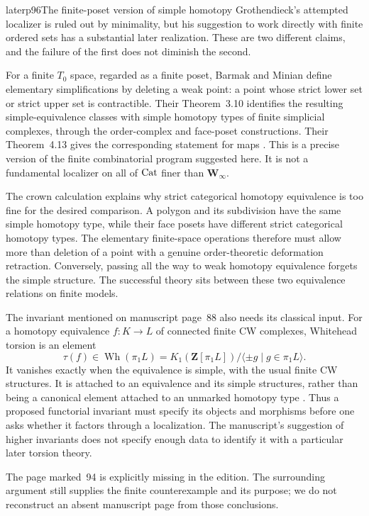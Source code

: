 \begin{dcomment}{later}{p96}{The finite-poset version of simple homotopy}
Grothendieck's attempted localizer is ruled out by minimality, but his suggestion to work directly with finite ordered sets has a substantial later realization. These are two different claims, and the failure of the first does not diminish the second.

For a finite $T_0$ space, regarded as a finite poset, Barmak and Minian define elementary simplifications by deleting a weak point: a point whose strict lower set or strict upper set is contractible. Their Theorem~3.10 identifies the resulting simple-equivalence classes with simple homotopy types of finite simplicial complexes, through the order-complex and face-poset constructions. Their Theorem~4.13 gives the corresponding statement for maps \citep{BarmakMinian2008}. This is a precise version of the finite combinatorial program suggested here. It is not a fundamental localizer on all of $\mathrm{Cat}$ finer than $\mathbf W_\infty$.

The crown calculation explains why strict categorical homotopy equivalence is too fine for the desired comparison. A polygon and its subdivision have the same simple homotopy type, while their face posets have different strict categorical homotopy types. The elementary finite-space operations therefore must allow more than deletion of a point with a genuine order-theoretic deformation retraction. Conversely, passing all the way to weak homotopy equivalence forgets the simple structure. The successful theory sits between these two equivalence relations on finite models.

The invariant mentioned on manuscript page~88 also needs its classical input. For a homotopy equivalence $f:K\to L$ of connected finite CW complexes, Whitehead torsion is an element
\[
 \tau(f)\in\operatorname{Wh}(\pi_1L)
 =K_1(\mathbf Z[\pi_1L])/\langle\pm g\mid g\in\pi_1L\rangle.
\]
It vanishes exactly when the equivalence is simple, with the usual finite CW structures. It is attached to an equivalence and its simple structures, rather than being a canonical element attached to an unmarked homotopy type \citep[Section~7]{Milnor1966Whitehead}. Thus a proposed functorial invariant must specify its objects and morphisms before one asks whether it factors through a localization. The manuscript's suggestion of higher invariants does not specify enough data to identify it with a particular later torsion theory.

The page marked~94 is explicitly missing in the edition. The surrounding argument still supplies the finite counterexample and its purpose; we do not reconstruct an absent manuscript page from those conclusions.
\end{dcomment}


